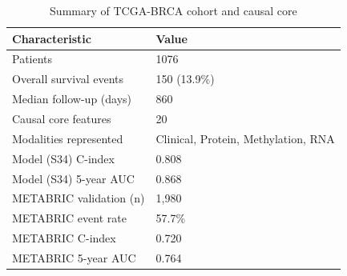 \begin{table}[htbp]
\centering
\caption{Summary of TCGA-BRCA cohort and causal core}
\label{tab:cohort}
\begin{tabular}{ll}
\toprule
Characteristic & Value \\
\midrule
Patients & 1076 \\
Overall survival events & 150 (13.9\%) \\
Median follow-up (days) & 860 \\
Causal core features & 20 \\
Modalities represented & Clinical, Protein, Methylation, RNA \\
\midrule
Model (S34) C-index & 0.808 \\
Model (S34) 5-year AUC & 0.868 \\
\midrule
METABRIC validation (n) & 1,980 \\
METABRIC event rate & 57.7\% \\
METABRIC C-index & 0.720 \\
METABRIC 5-year AUC & 0.764 \\
\bottomrule
\end{tabular}
\end{table}